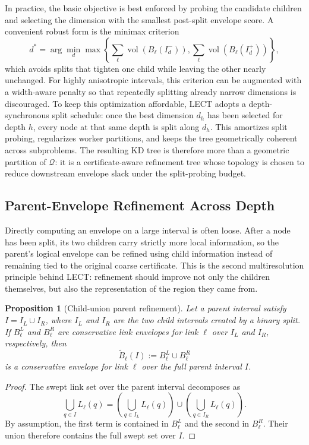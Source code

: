 \documentclass[journal]{IEEEtran}
\newtheorem{proposition}{Proposition}
\newcommand{\Q}{\ensuremath{\mathcal{Q}}}
\begin{document}
In practice, the basic objective is best enforced by probing the candidate
children and selecting the dimension with the smallest post-split envelope
score. A convenient robust form is the minimax criterion
\[
d^* = \arg\min_d
\max\!\left\{\sum_{\ell}\operatorname{vol}(B_\ell(I_d^-)),
\sum_{\ell}\operatorname{vol}(B_\ell(I_d^+))\right\},
\]
which avoids splits that tighten one child while leaving the other
nearly unchanged. For highly anisotropic intervals, this criterion can be
augmented with a width-aware penalty so that repeatedly splitting already
narrow dimensions is discouraged. To keep this optimization affordable, LECT
adopts a depth-synchronous split schedule: once the best dimension $d_h$ has
been selected for depth $h$, every node at that same depth is split along
$d_h$. This amortizes split probing, regularizes worker partitions, and keeps
the tree geometrically coherent across subproblems. The resulting KD tree is
therefore more than a geometric partition of $\Q$: it is a
certificate-aware refinement tree whose topology is chosen to reduce downstream
envelope slack under the split-probing budget.

\subsection{Parent-Envelope Refinement Across Depth}
\label{sec:lect_parent_refine}

Directly computing an envelope on a large interval is often loose. After a node
has been split, its two children carry strictly more local information, so the
parent's logical envelope can be refined using child information instead of
remaining tied to the original coarse certificate. This is the second
multiresolution principle behind LECT: refinement should improve not only the
children themselves, but also the representation of the region they came from.

\begin{proposition}[Child-union parent refinement]
\label{prop:parent_union}
Let a parent interval satisfy $I = I_L \cup I_R$, where $I_L$ and $I_R$ are the
two child intervals created by a binary split. If $B_\ell^L$ and $B_\ell^R$ are
conservative link envelopes for link $\ell$ over $I_L$ and $I_R$, respectively,
then
\[
\widetilde{B}_\ell(I) := B_\ell^L \cup B_\ell^R
\]
is a conservative envelope for link $\ell$ over the full parent interval $I$.
\end{proposition}

\begin{proof}
The swept link set over the parent interval decomposes as
\[
\bigcup_{q\in I} L_\ell(q)
= \left(\bigcup_{q\in I_L} L_\ell(q)\right)
\cup
\left(\bigcup_{q\in I_R} L_\ell(q)\right).
\]
By assumption, the first term is contained in $B_\ell^L$ and the second in
$B_\ell^R$. Their union therefore contains the full swept set over $I$.
\end{proof}
\end{document}
